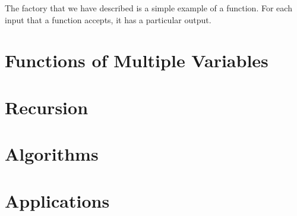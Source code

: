 \documentclass[a4paper,10pt]{report}
\begin{document}
The factory that we have described is a simple example of a \gls{function}. For
each input that a function accepts, it has a particular output.

\chapter{Functions of Multiple Variables}

\chapter{Recursion}

\chapter{Algorithms}

\chapter{Applications}


\printglossaries
\end{document}
